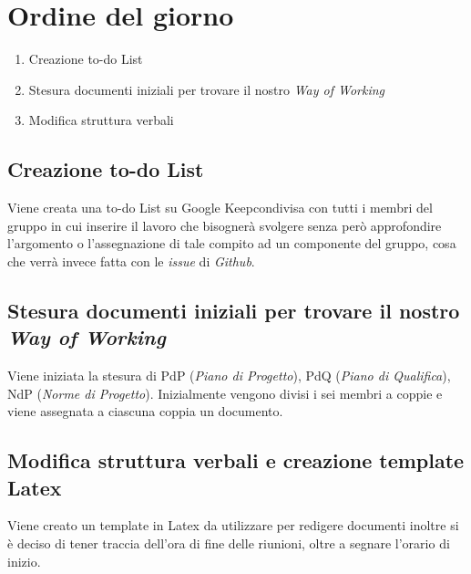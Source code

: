 \section{Ordine del giorno}
\begin{enumerate}
\item Creazione to-do List
\item Stesura documenti iniziali per trovare il nostro \textit{Way of Working}
\item Modifica struttura verbali
\end{enumerate}

\subsection{Creazione to-do List}
Viene creata una to-do List su Google Keep\glo condivisa con tutti i membri del gruppo 
in cui inserire il lavoro che bisognerà svolgere senza però approfondire l'argomento o l'assegnazione 
di tale compito ad un componente del gruppo, cosa che verrà invece fatta con le \textit{issue} di \textit{Github}.
\subsection{Stesura documenti iniziali per trovare il nostro \textit{Way of Working}}
Viene iniziata la stesura di PdP (\textit{Piano di Progetto}), 
PdQ (\textit{Piano di Qualifica}), NdP (\textit{Norme di Progetto}). 
Inizialmente vengono divisi i sei membri a coppie e viene assegnata a ciascuna coppia un documento.

\subsection{Modifica struttura verbali e creazione template Latex}
Viene creato un template in Latex da utilizzare per redigere documenti inoltre
si è deciso di tener traccia dell’ora di fine delle riunioni, oltre a segnare l’orario di inizio.
